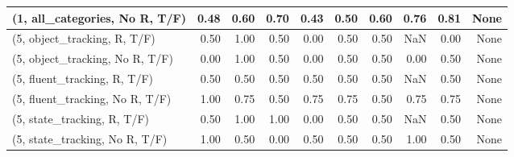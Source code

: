 \begin{table*}[h!]
\begin{adjustbox}{width=2\columnwidth,center}
\begin{tabular}{lrrr|rrr|rrr}
(1, all\_categories, No R, T/F)       &                      0.48 &                  0.60 &                      0.70 &                          0.43 &                      0.50 &                          0.60 &                                   0.76 &                               0.81 &                                  None \\



\midrule
(5, object\_tracking, R, T/F)         &                      0.50 &                  1.00 &                      0.50 &                          0.00 &                      0.50 &                          0.50 &                                    NaN &                               0.00 &                                  None \\
(5, object\_tracking, No R, T/F)      &                      0.00 &                  1.00 &                      0.50 &                          0.00 &                      0.50 &                          0.50 &                                   0.00 &                               0.50 &                                  None \\
(5, fluent\_tracking, R, T/F)         &                      0.50 &                  0.50 &                      0.50 &                          0.50 &                      0.50 &                          0.50 &                                    NaN &                               0.50 &                                  None \\
(5, fluent\_tracking, No R, T/F)      &                      1.00 &                  0.75 &                      0.50 &                          0.75 &                      0.75 &                          0.50 &                                   0.75 &                               0.75 &                                  None \\
(5, state\_tracking, R, T/F)          &                      0.50 &                  1.00 &                      1.00 &                          0.00 &                      0.50 &                          0.50 &                                    NaN &                               0.50 &                                  None \\
(5, state\_tracking, No R, T/F)       &                      1.00 &                  0.50 &                      0.00 &                          0.50 &                      0.50 &                          0.50 &                                   1.00 &                               0.50 &                                  None \\

\end{tabular}
\end{adjustbox}
\end{table*}

